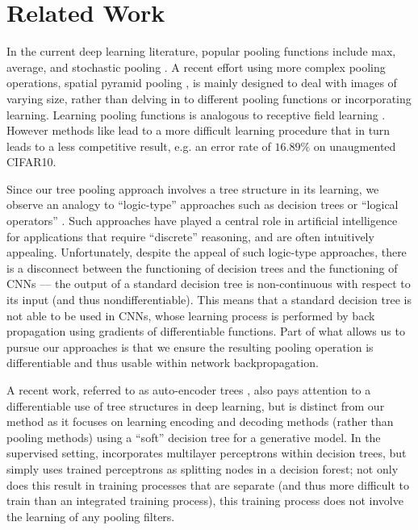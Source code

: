 \documentclass[twoside]{article}
\begin{document}
\section{Related Work}
\vspace{-4mm}

In the current deep learning literature, popular pooling functions include max,
average, and stochastic pooling \cite{boureau2010theoretical,boureau2011ask,zeiler2013stochastic}.
A recent effort using more complex pooling operations, spatial pyramid pooling 
\cite{he2014spatial}, is mainly designed to deal with images of varying size, 
rather than delving in to different pooling functions or incorporating 
learning. Learning pooling functions is analogous to 
receptive field learning \cite{gulcehre2014learned,hubel1962receptive,coates2011selecting,
jia2012beyond}. However methods like \cite{jia2012beyond} lead to a more 
difficult learning procedure that in turn leads to a less competitive result, 
e.g. an error rate of $16.89\%$ on unaugmented CIFAR10. 

Since our tree pooling approach involves a tree structure in its learning, 
we observe an analogy to ``logic-type'' approaches such as decision trees \cite{quinlan1993c45} 
or ``logical operators'' \cite{minker2000logic}. Such approaches have played a central 
role in artificial intelligence for applications that require ``discrete'' reasoning,
and are often intuitively appealing. Unfortunately, despite the appeal of such logic-type 
approaches, there is a disconnect between the functioning of decision trees and 
the functioning of CNNs --- the output of a standard decision tree is non-continuous 
with respect to its input (and thus nondifferentiable). This means that a standard 
decision tree is not able to be used in CNNs, whose learning process is performed 
by back propagation using gradients of differentiable functions. Part of what allows 
us to pursue our approaches is that we ensure the resulting pooling operation is 
differentiable and thus usable within network backpropagation. 

A recent work, referred to as auto-encoder trees \cite{irsoy2014autoencoder}, also
pays attention to a differentiable use of tree structures in deep learning, but 
is distinct from our method as it focuses on learning encoding and decoding methods 
(rather than pooling methods) using a ``soft'' decision tree for a generative model. 
In the supervised setting, \cite{bulo2014neural} incorporates multilayer perceptrons 
within decision trees, but simply uses trained perceptrons as splitting nodes in 
a decision forest; not only does this result in training processes that are separate
(and thus more difficult to train than an integrated training process), this training 
process does not involve the learning of any pooling filters. 
\end{document}
